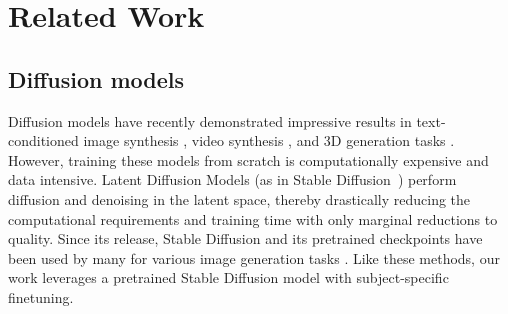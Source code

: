 \vspace{-0.5em}
\section{Related Work}
    \subsection{Diffusion models}
        Diffusion models have recently demonstrated impressive results in text-conditioned image synthesis \cite{stable_diffusion,dalle2,imagen}, video synthesis \cite{imagen_video,video-diffusion-models,dreamix}, and 3D generation tasks \cite{dream_fusion,make-a-video-3d}. However, training these models from scratch is computationally expensive and data intensive.
        Latent Diffusion Models (as in Stable Diffusion~\cite{stable_diffusion}) perform diffusion and denoising in the latent space, thereby drastically reducing the computational requirements and training time with only marginal reductions to quality.
        Since its release, Stable Diffusion and its pretrained checkpoints have been used by many for various image generation tasks \cite{universal_guidance,instruct_pix2pix,dreambooth}. Like these methods, our work leverages a pretrained Stable Diffusion model with subject-specific finetuning. %
            
